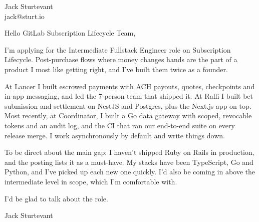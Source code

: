 \documentclass[11pt]{article}
\begin{document}
\raggedright

{\namefont\fontsize{20pt}{24pt}\selectfont Jack Sturtevant}\\[-0.3em]
jack@sturt.io

\vspace{1.2em}

Hello GitLab Subscription Lifecycle Team,

I'm applying for the Intermediate Fullstack Engineer role on Subscription Lifecycle. Post-purchase flows where money changes hands are the part of a product I most like getting right, and I've built them twice as a founder.

At Lancer I built escrowed payments with ACH payouts, quotes, checkpoints and in-app messaging, and led the 7-person team that shipped it. At Ralli I built bet submission and settlement on NestJS and Postgres, plus the Next.js app on top. Most recently, at Coordinator, I built a Go data gateway with scoped, revocable tokens and an audit log, and the CI that ran our end-to-end suite on every release merge. I work asynchronously by default and write things down.

To be direct about the main gap: I haven't shipped Ruby on Rails in production, and the posting lists it as a must-have. My stacks have been TypeScript, Go and Python, and I've picked up each new one quickly. I'd also be coming in above the intermediate level in scope, which I'm comfortable with.

I'd be glad to talk about the role.

\vspace{0.6em}
Jack Sturtevant
\end{document}
